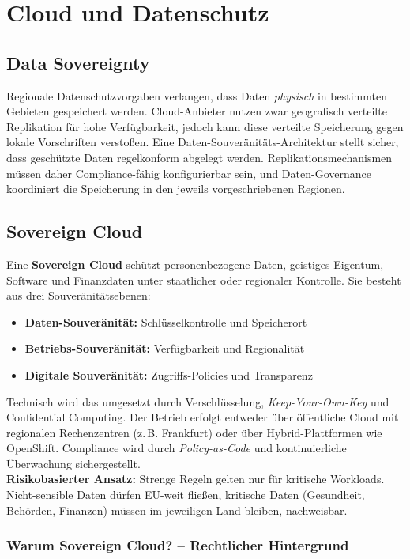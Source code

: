 \section{Cloud und Datenschutz}

\subsection{Data Sovereignty}
Regionale Datenschutzvorgaben verlangen, dass Daten \emph{physisch} in
bestimmten Gebieten gespeichert werden. Cloud-Anbieter nutzen zwar
geografisch verteilte Replikation für hohe Verfügbarkeit, jedoch kann
diese verteilte Speicherung gegen lokale Vorschriften verstoßen.
Eine Daten-Souveränitäts-Architektur stellt sicher, dass geschützte
Daten regelkonform abgelegt werden. Replikationsmechanismen müssen
daher Compliance-fähig konfigurierbar sein, und Daten-Governance
koordiniert die Speicherung in den jeweils vorgeschriebenen Regionen.

\subsection{Sovereign Cloud}
Eine \textbf{Sovereign Cloud} schützt personenbezogene Daten, geistiges
Eigentum, Software und Finanzdaten unter staatlicher oder regionaler
Kontrolle. Sie besteht aus drei Souveränitätsebenen:
\begin{itemize}
    \item \textbf{Daten-Souveränität:} Schlüsselkontrolle und Speicherort
    \item \textbf{Betriebs-Souveränität:} Verfügbarkeit und Regionalität
    \item \textbf{Digitale Souveränität:} Zugriffs-Policies und Transparenz
\end{itemize}

Technisch wird das umgesetzt durch Verschlüsselung,
\textit{Keep-Your-Own-Key} und Confidential Computing.
Der Betrieb erfolgt entweder über öffentliche Cloud mit regionalen
Rechenzentren (z.\,B. Frankfurt) oder über Hybrid-Plattformen wie
OpenShift. Compliance wird durch \textit{Policy-as-Code} und
kontinuierliche Überwachung sichergestellt.\\[4pt]
\textbf{Risikobasierter Ansatz:} Strenge Regeln gelten nur für
kritische Workloads. Nicht-sensible Daten dürfen EU-weit fließen,
kritische Daten (Gesundheit, Behörden, Finanzen) müssen im jeweiligen
Land bleiben, nachweisbar.

\subsubsection{Warum Sovereign Cloud? – Rechtlicher Hintergrund}

